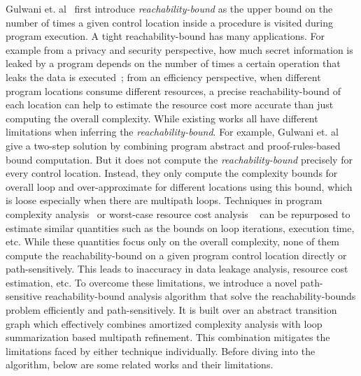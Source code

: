 
Gulwani et. al~\cite{GulwaniZ10} first introduce \emph{reachability-bound} as the upper bound on the number of times a given control location 
inside a procedure is visited during program execution.
A tight reachability-bound has many applications.
For example from a privacy and security perspective,
how much secret information is leaked by a program depends on the number of times a certain operation that leaks the data
is executed~\cite{Malacaria07};
from an efficiency perspective, when different program locations consume different resources, a precise reachability-bound of each location can help to estimate the resource cost more accurate than just computing the overall complexity.
While existing works all have different limitations when inferring the \emph{reachability-bound}.
For example, Gulwani et. al~\cite{GulwaniZ10}
give a two-step solution by combining program abstract and proof-rules-based bound computation.
But it does not compute the \emph{reachability-bound} precisely for every control location.
Instead, they only compute the complexity bounds for overall loop and over-approximate for different locations using this bound,
which is loose especially when there are multipath loops.
Techniques in program complexity analysis~\cite{GustafssonEL05,HumenbergerJK18} 
or worst-case resource cost analysis
~\cite{BrockschmidtEFFG16,AlbertAGP08,AliasDFG10,Flores-MontoyaH14} can be repurposed to estimate similar quantities such as the
bounds on loop iterations, execution time, etc.
While these quantities focus only on  
the overall complexity,
none of them compute the reachability-bound on a given program control location directly or path-sensitively.
This leads to inaccuracy in data leakage analysis, resource cost estimation, etc.
To overcome these limitations, 
we introduce a novel path-sensitive reachability-bound analysis algorithm that solve 
the reachability-bounds problem efficiently and path-sensitively.
It is built over an abstract transition graph which effectively combines amortized complexity analysis with loop summarization based multipath refinement.
This combination mitigates the limitations faced by either technique individually. 
Before diving into the algorithm, below are some related works and their limitations.

